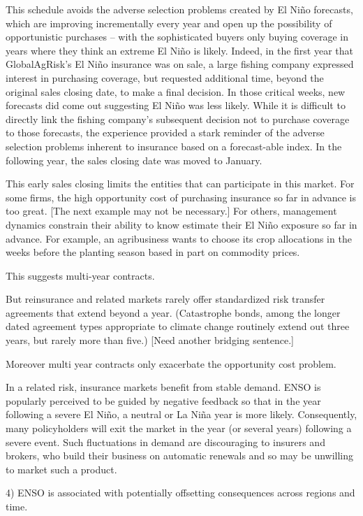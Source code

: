 \documentclass[authoryear]{article}
\begin{document}
This schedule avoids the adverse selection problems created by El Ni\~no forecasts, which are improving incrementally every year and open up the possibility of opportunistic purchases – with the sophisticated buyers only buying coverage in years where they think an extreme El Ni\~no is likely. Indeed, in the first year that GlobalAgRisk’s El Ni\~no insurance was on sale, a large fishing company expressed interest in purchasing coverage, but requested additional time, beyond the original sales closing date, to make a final decision. In those critical weeks, new forecasts did come out suggesting El Ni\~no was less likely. While it is difficult to directly link the fishing company's subsequent decision not to purchase coverage to those forecasts, the experience provided a stark reminder of the adverse selection problems inherent to insurance based on a forecast-able index. In the following year, the sales closing date was moved to January.

This early sales closing limits the entities that can participate in this market. For some firms, the high opportunity cost of purchasing insurance so far in advance is too great. [The next example may not be necessary.] For others, management dynamics constrain their ability to know estimate their El Ni\~no exposure so far in advance. For example, an agribusiness wants to choose its crop allocations in the weeks before the planting season based in part on commodity prices.


This suggests multi-year contracts. 

But reinsurance and related markets rarely offer standardized risk transfer agreements that extend beyond a year. (Catastrophe bonds, among the longer dated agreement types appropriate to climate change routinely extend out three years, but rarely more than five.) [Need another bridging sentence.] 

Moreover multi year contracts only exacerbate the opportunity cost problem.


In a related risk, insurance markets benefit from stable demand. ENSO is popularly perceived to be guided by negative feedback so that in the year following a severe El Ni\~no, a neutral or La Ni\~na year is more likely. Consequently, many policyholders will exit the market in the year (or several years) following a severe event. Such fluctuations in demand are discouraging to insurers and brokers, who build their business on automatic renewals and so may be unwilling to market such a product.

4) ENSO is associated with potentially offsetting consequences across regions and time. 
\end{document}
